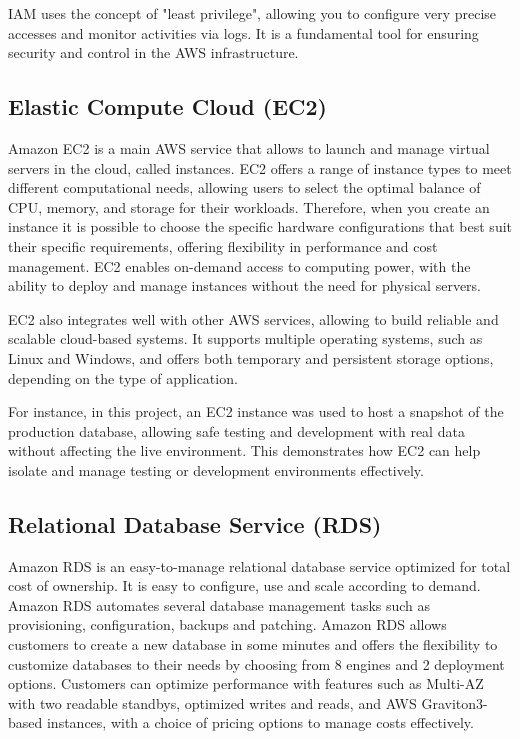 \ac{IAM} uses the concept of "least privilege", allowing you to configure very precise accesses and monitor activities via logs. It is a fundamental tool for ensuring security and control in the \ac{AWS} infrastructure.
\subsection{Elastic Compute Cloud (EC2)}
Amazon \acf{EC2} is a main \ac{AWS} service that allows to launch and manage virtual servers in the cloud, called instances. \ac{EC2} offers a range of instance types to meet different computational needs, allowing users to select the optimal balance of \ac{CPU}, memory, and storage for their workloads. Therefore, when you create an instance it is possible to choose the specific hardware configurations that best suit their specific requirements, offering flexibility in performance and cost management. \ac{EC2} enables on-demand access to computing power, with the ability to deploy and manage instances without the need for physical servers.

\ac{EC2} also integrates well with other \ac{AWS} services, allowing to build reliable and scalable cloud-based systems. It supports multiple operating systems, such as Linux and Windows, and offers both temporary and persistent storage options, depending on the type of application.

For instance, in this project, an \ac{EC2} instance was used to host a snapshot of the production database, allowing safe testing and development with real data without affecting the live environment. This demonstrates how \ac{EC2} can help isolate and manage testing or development environments effectively.
\subsection{Relational Database Service (RDS)}
\label{sec:rds}
Amazon \ac{RDS} is an easy-to-manage relational database service optimized for total cost of ownership. It is easy to configure, use and scale according to demand. Amazon \ac{RDS} automates several database management tasks such as provisioning, configuration, backups and patching. Amazon \ac{RDS} allows customers to create a new database in some minutes and offers the flexibility to customize databases to their needs by choosing from 8 engines and 2 deployment options. Customers can optimize performance with features such as Multi-AZ with two readable standbys, optimized writes and reads, and \ac{AWS} Graviton3-based instances, with a choice of pricing options to manage costs effectively.

